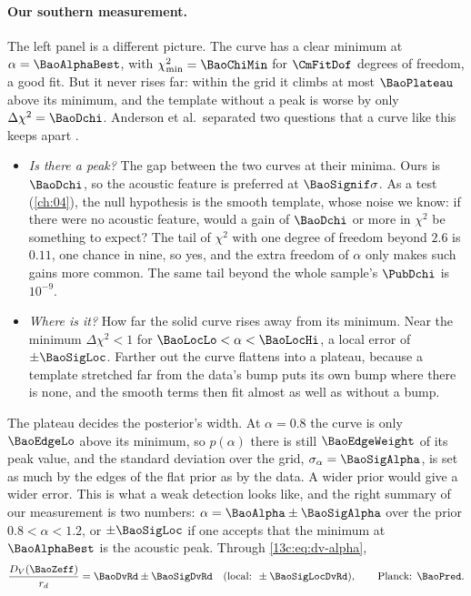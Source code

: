 \paragraph{Our southern measurement.} The left panel is a different picture. The
curve has a clear minimum at $\alpha=\BaoAlphaBest$, with $\chi^2_{\min}=\BaoChiMin$
for $\CmFitDof$ degrees of freedom, a good fit. But it never rises far: within the
grid it climbs at most $\BaoPlateau$ above its minimum, and the template without a
peak is worse by only $\Delta\chi^2=\BaoDchi$. Anderson et al.\ separated two
questions that a curve like this keeps apart .
\begin{itemize}[itemsep=1pt,leftmargin=1.2em]
  \item \emph{Is there a peak?} The gap between the two curves at their minima. Ours is
        $\BaoDchi$, so the acoustic feature is preferred at $\BaoSignif\sigma$. As
        a test (\cref{ch:04}), the null hypothesis is the smooth template, whose
        noise we know: if there were no acoustic feature, would a gain of $\BaoDchi$ or
        more in $\chi^2$ be something to expect? The tail of $\chi^2$ with one degree
        of freedom beyond $2.6$ is $0.11$, one chance in nine, so yes, and the extra
        freedom of $\alpha$ only makes such gains more common. The same tail beyond the
        whole sample's $\PubDchi$ is $10^{-9}$.
  \item \emph{Where is it?} How far the solid curve rises away from its minimum. Near
        the minimum $\Delta\chi^2<1$ for $\BaoLocLo<\alpha<\BaoLocHi$, a local error
        of $\pm\BaoSigLoc$. Farther out the curve flattens into a plateau, because a
        template stretched far from the data's bump puts its own bump where there is
        none, and the smooth terms then fit almost as well as without a bump.
\end{itemize}
The plateau decides the posterior's width. At $\alpha=0.8$ the curve is only
$\BaoEdgeLo$ above its minimum, so $p(\alpha)$ there is still $\BaoEdgeWeight$ of its
peak value, and the standard deviation over the grid, $\sigma_\alpha=\BaoSigAlpha$,
is set as much by the edges of the flat prior as by the data. A wider prior would
give a wider error. This is what a weak detection looks like, and the right summary of
our measurement is two numbers: $\alpha=\BaoAlpha\pm\BaoSigAlpha$ over the prior
$0.8<\alpha<1.2$, or $\pm\BaoSigLoc$ if one accepts that the minimum at
$\BaoAlphaBest$ is the acoustic peak. Through \eqref{13c:eq:dv-alpha},
\begin{equation}
  \frac{D_V(\BaoZeff)}{r_d}=\BaoDvRd\pm\BaoSigDvRd\quad(\text{local: }\pm\BaoSigLocDvRd),
  \qquad\text{Planck: }\BaoPred .
  \label{13c:eq:our-dv}
\end{equation}


